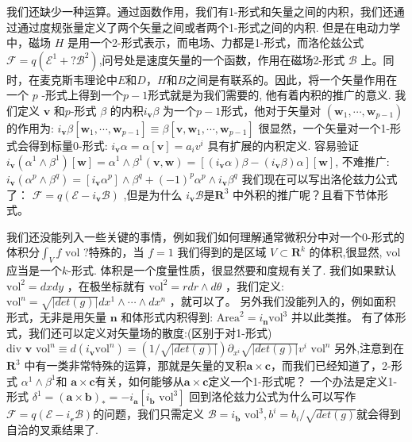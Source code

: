 \documentclass[supercite]{HustGraduPaper}
\begin{document}
\begin{appendices}
		
		我们还缺少一种运算。通过函数作用，我们有1-形式和矢量之间的内积，我们还通过通过度规张量定义了两个矢量之间或者两个1-形式之间的内积. 但是在电动力学中，磁场 $H$ 是用一个2-形式表示，而电场、力都是1-形式，而洛伦兹公式 $\mathcal{F} = q(\mathcal{E}^1 + ? \mathcal{B}^2) $,问号处是速度矢量的一个函数，作用在磁场2-形式 $\mathcal{B}$ 上。同时，在麦克斯韦理论中$E$和$D$，$H$和$B$之间是有联系的。因此，将一个矢量作用在一个 $p$ -形式上得到一个$p-1$形式就是为我们需要的, 他有着内积的推广的意义.
		我们定义 $\mathbf{v}$ 和$p$-形式 $\beta$ 的内积$ i_\mathbf{v} \beta$ 为一个$p-1$形式，他对于矢量对 $(\mathbf{w}_1,\cdots , \mathbf{w}_{p-1})$ 的作用为:
		$i_{\mathbf{v}}\beta [\mathbf{w}_1,\cdots , \mathbf{w}_{p-1}] \equiv \beta[\mathbf{v},\mathbf{w}_1,\cdots , \mathbf{w}_{p-1}] $
		很显然，一个矢量对一个1-形式会得到标量0-形式: $i_{\mathbf{v}} \alpha = \alpha[\mathbf{v}] = a_i v^i$ 具有扩展的内积定义.
		容易验证 $i_{\mathbf{v}} (\alpha^1 \wedge \beta^1)[\mathbf{w}] = \alpha^1 \wedge \beta^1(\mathbf{v},\mathbf{w}) = [(i_{\mathbf{v}}\alpha)\beta-(i_{\mathbf{v}}\beta)\alpha][\mathbf{w}] $, 不难推广:
		$i_{\mathbf{v}} (\alpha^p \wedge \beta^q) = [i_{\mathbf{v}}\alpha^p] \wedge \beta^q + (-1)^p \alpha^p \wedge i_{\mathbf{v}} \beta^q$
		我们现在可以写出洛伦兹力公式了： $\mathcal{F} = q(\mathcal{E} - i_{\mathbf{v}}\mathcal{B})$ ,但是为什么 $i_{\mathbf{v}}\mathcal{B} $是$ \mathbf{R}^3$ 中外积的推广呢？且看下节体形式。
		
		我们还没能列入一些关键的事情，例如我们如何理解通常微积分中对一个0-形式的体积分$ \int_V f \text{ vol}$ ?特殊的，当 $f = 1$ 我们得到的是区域 $V \subset \mathbf{R}^k$ 的体积,很显然, $\text{vol}$ 应当是一个$k$-形式. 体积是一个度量性质，很显然要和度规有关了. 我们如果默认 $\text{vol}^2 = dxdy$ ，在极坐标就有 $\text{vol}^2 = rdr\wedge d\theta$ ，我们定义:
		$\text{vol}^n = \sqrt{|det(g)|} dx^1 \wedge\cdots\wedge dx^n$ ，就可以了。
		另外我们没能列入的，例如面积形式，无非是用矢量 $\mathbf{n}$ 和体形式内积得到:
		$\text{Area}^2 = i_{\mathbf{n}} \text{vol}^3$ 并以此类推。
		有了体形式，我们还可以定义对矢量场的散度:(区别于对1-形式)
		$\text{div } \mathbf{v} \text{ vol}^n \equiv d(i_{\mathbf{v}} \text{vol}^n) = (1/\sqrt{|det(g)|}) \partial_{x^i} \sqrt{|det(g)|}v^i \text{ vol}^n$ 
		另外,注意到在 $\mathbf{R}^3$ 中有一类非常特殊的运算，那就是矢量的叉积$\mathbf{a} \times \mathbf{c}$，而我们已经知道了，2-形式 $\alpha^1 \wedge \beta^1 $和 $\mathbf{a} \times \mathbf{c} $有关，如何能够从$\mathbf{a} \times \mathbf{c}$定义一个1-形式呢？
		一个办法是定义1-形式 $\delta^1 = (\mathbf{a}\times\mathbf{b})_*  = -i_\mathbf{a}[i_{\mathbf{b}} \text{ vol}^3]$ 
		回到洛伦兹力公式为什么可以写作$\mathcal{F} = q(\mathcal{E} - i_{\mathcal{v}}\mathcal{B})$的问题，我们只需定义 $\mathcal{B}=i_{\mathbf{b}}\text{ vol}^3,b^i=b_i/\sqrt{det(g)} $就会得到自洽的叉乘结果了.
		

\end{appendices}
\end{document}

